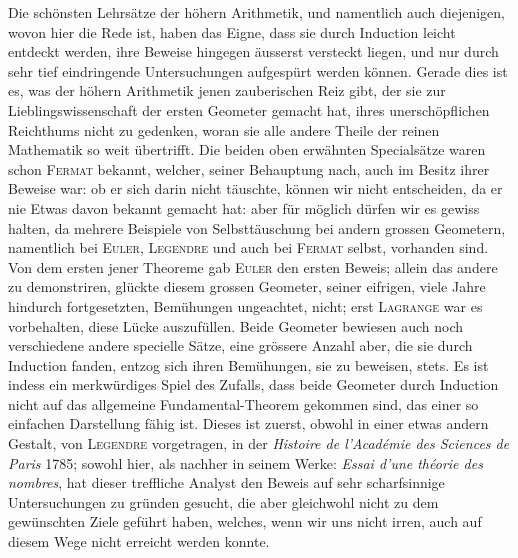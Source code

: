 Die schönsten Lehrsätze der höhern Arithmetik, und namentlich auch diejenigen, wovon hier die Rede ist, haben das Eigne, dass sie durch Induction leicht entdeckt werden, ihre Beweise hingegen äusserst versteckt liegen, und nur durch sehr tief eindringende Untersuchungen aufgespürt werden können. Gerade dies ist es, was der höhern Arithmetik jenen zauberischen Reiz gibt, der sie zur Lieblingswissenschaft der ersten Geometer gemacht hat, ihres unerschöpflichen Reichthums nicht zu gedenken, woran sie alle andere Theile der reinen Mathematik so weit übertrifft. Die beiden oben erwähnten Specialsätze waren schon \textsc{Fermat} bekannt, welcher, seiner Behauptung nach, auch im Besitz ihrer Beweise war: ob er sich darin nicht täuschte, können wir nicht entscheiden, da er nie Etwas davon bekannt gemacht hat: aber für möglich dürfen wir es gewiss halten, da mehrere Beispiele von Selbsttäuschung bei andern grossen Geometern, namentlich bei \textsc{Euler}, \textsc{Legendre} und auch bei \textsc{Fermat} selbst, vorhanden sind. Von dem ersten jener Theoreme gab \textsc{Euler} den ersten Beweis; allein das andere zu demonstriren, glückte diesem grossen Geometer, seiner eifrigen, viele Jahre hindurch fortgesetzten, Bemühungen ungeachtet, nicht; erst \textsc{Lagrange} war es vorbehalten, diese Lücke auszufüllen. Beide Geometer bewiesen auch noch verschiedene andere specielle Sätze, eine grössere Anzahl aber, die sie durch Induction fanden, entzog sich ihren Bemühungen, sie zu beweisen, stets. Es ist indess ein merkwürdiges Spiel des Zufalls, dass beide Geometer durch Induction nicht auf das allgemeine Fundamental-Theorem gekommen sind, das einer so einfachen Darstellung fähig ist. Dieses ist zuerst, obwohl in einer etwas andern Gestalt, von \textsc{Legendre} vorgetragen, in der \emph{Histoire de l'Académie des Sciences de Paris} 1785; sowohl hier, als nachher in seinem Werke: \emph{Essai d'une théorie des nombres}, hat
%
dieser treffliche Analyst den Beweis auf sehr scharfsinnige Untersuchungen zu gründen gesucht, die aber gleichwohl nicht zu dem gewünschten Ziele geführt haben, welches, wenn wir uns nicht irren, auch auf diesem Wege nicht erreicht werden konnte.

